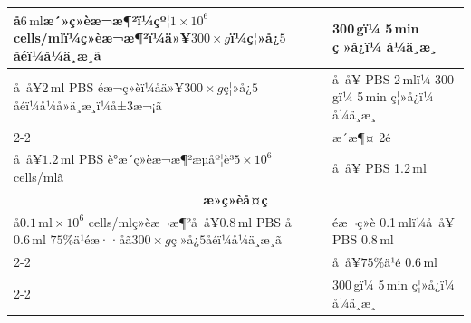 \documentclass[UTF8,10pt,a4paper,fontset=fandol]{ctexart}
\newcommand{\fieldvalue}[1]{#1}
\newcommand{\handwritten}[1]{#1}
\begin{document}
\begin{tabularx}{\textwidth}{|X|X|}
\hline
å$6\,\mathrm{ml}$æ´»ç»èæ¬æ¶²ï¼çº¦$1\times10^{6}$ cells/mlï¼ç»èæ¬æ¶²ï¼ä»¥$300\times g$ï¼ç¦»å¿$5$åéï¼å¼ä¸æ¸ã &
\fieldvalue{\handwritten{300}}\,gï¼%
\fieldvalue{\handwritten{5}}\,min ç¦»å¿ï¼%
\fieldvalue{\handwritten{\checkmark}}å¼ä¸æ¸
\\ \hline
å å¥$2\,\mathrm{ml}$ PBS éæ¬ç»èï¼åä»¥$300\times g$ç¦»å¿$5$åéï¼å¼å»ä¸æ¸ï¼å±$3$æ¬¡ã &
å å¥ PBS %
\fieldvalue{\handwritten{2}}\,mlï¼%
\fieldvalue{\handwritten{300}}\,gï¼%
\fieldvalue{\handwritten{5}}\,min ç¦»å¿ï¼%
\fieldvalue{\handwritten{\checkmark}}å¼ä¸æ¸
\\ \cline{2-2}
&
æ´æ¶¤ %
\fieldvalue{\handwritten{2}}é
\\ \hline
å å¥$1.2\,\mathrm{ml}$ PBS è°æ´ç»èæ¬æ¶²æµåº¦è³$5\times10^{6}$ cells/mlã &
å å¥ PBS %
\fieldvalue{\handwritten{1.2}}\,ml
\\ \hline
\multicolumn{2}{|c|}{\textbf{æ­»ç»èå¤ç}}\\ \hline
å$0.1\,\mathrm{ml}\times10^{6}$ cells/mlç»èæ¬æ¶²å å¥$0.8\,\mathrm{ml}$ PBS å$0.6\,\mathrm{ml}$ $75\%$ä¹éæ··åã$300\times g$ç¦»å¿$5$åéï¼å¼ä¸æ¸ã &
éæ¬ç»è %
\fieldvalue{\handwritten{0.1}}\,mlï¼å å¥ PBS %
\fieldvalue{\handwritten{0.8}}\,ml
\\ \cline{2-2}
&
å å¥$75\%$ä¹é %
\fieldvalue{\handwritten{0.6}}\,ml
\\ \cline{2-2}
&
%
\fieldvalue{\handwritten{300}}\,gï¼%
\fieldvalue{\handwritten{5}}\,min ç¦»å¿ï¼%
\fieldvalue{\handwritten{\checkmark}}å¼ä¸æ¸
\\ \hline

\end{tabularx}
\end{document}
